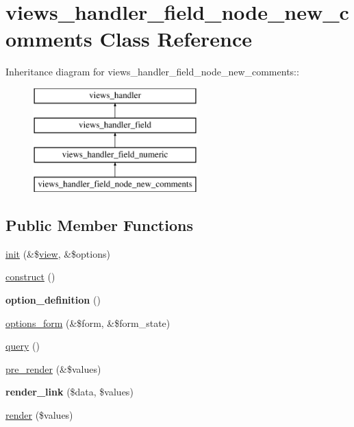 \hypertarget{classviews__handler__field__node__new__comments}{
\section{views\_\-handler\_\-field\_\-node\_\-new\_\-comments Class Reference}
\label{classviews__handler__field__node__new__comments}
}
Inheritance diagram for views\_\-handler\_\-field\_\-node\_\-new\_\-comments::\begin{figure}[H]
\begin{center}
\leavevmode
\includegraphics[height=4cm]{classviews__handler__field__node__new__comments}
\end{center}
\end{figure}
\subsection*{Public Member Functions}
\begin{DoxyCompactItemize}
\item 
\hyperlink{classviews__handler__field__node__new__comments_aef91916aec8e7a7c77ea1c9079de19b6}{init} (\&\$\hyperlink{classview}{view}, \&\$options)
\item 
\hyperlink{classviews__handler__field__node__new__comments_aa496a5184a390c29a60e0dc7d16c23e5}{construct} ()
\item 
\hypertarget{classviews__handler__field__node__new__comments_aeea2f5790d310ddcaba82c05593e82e7}{
{\bfseries option\_\-definition} ()}
\label{classviews__handler__field__node__new__comments_aeea2f5790d310ddcaba82c05593e82e7}

\item 
\hyperlink{classviews__handler__field__node__new__comments_a2a209d3acbaa47e781df96bc0ca85156}{options\_\-form} (\&\$form, \&\$form\_\-state)
\item 
\hyperlink{classviews__handler__field__node__new__comments_ab49cfad0c25d081f0ee70e2e0d0db809}{query} ()
\item 
\hyperlink{classviews__handler__field__node__new__comments_aa5442b95bd06e86ca293e30ae4ca96bb}{pre\_\-render} (\&\$values)
\item 
\hypertarget{classviews__handler__field__node__new__comments_ab8eb504af9ca179f32c2abeb4582bf75}{
{\bfseries render\_\-link} (\$data, \$values)}
\label{classviews__handler__field__node__new__comments_ab8eb504af9ca179f32c2abeb4582bf75}

\item 
\hyperlink{classviews__handler__field__node__new__comments_a6b1e79531ba28eb32e71c7ff2129e82d}{render} (\$values)
\end{DoxyCompactItemize}


